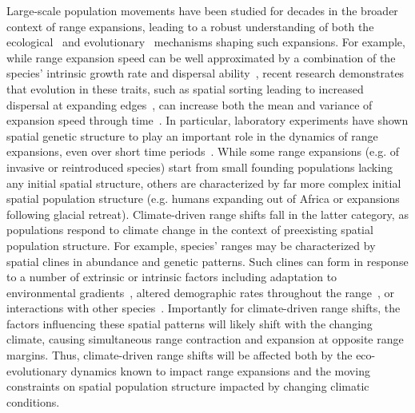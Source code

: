 \documentclass[11pt]{article}
\begin{document}
Large-scale population movements have been studied for decades in the broader context of range expansions, leading to a robust understanding of both the ecological~\citep{hastings2005spatial} and evolutionary~\citep{shine2011evolutionary, excoffier2009genetic} mechanisms shaping such expansions. For example, while range expansion speed can be well approximated by a combination of the species' intrinsic growth rate and dispersal ability~\citep{fisher1937wave, hastings2005spatial}, recent research demonstrates that evolution in these traits, such as spatial sorting leading to increased dispersal at expanding edges~\citep{shine2011evolutionary}, can increase both the mean and variance of expansion speed through time~\citep{szHucs2017rapid, shaw2015dispersal, phillips2015evolutionary}. In particular, laboratory experiments have shown spatial genetic structure to play an important role in the dynamics of range expansions, even over short time periods~\citep{weiss2017rapid, ochocki2017rapid}. While some range expansions (e.g. of invasive or reintroduced species) start from small founding populations lacking any initial spatial structure, others are characterized by far more complex initial spatial population structure (e.g. humans expanding out of Africa or expansions following glacial retreat). Climate-driven range shifts fall in the latter category, as populations respond to climate change in the context of preexisting spatial population structure. For example, species' ranges may be characterized by spatial clines in abundance and genetic patterns. Such clines can form in response to a number of extrinsic or intrinsic factors including adaptation to environmental gradients~\citep{kirkpatrick1997evolution}, altered demographic rates throughout the range~\citep{holt2005theoretical}, or interactions with other species~\citep{case2000interspecific}. Importantly for climate-driven range shifts, the factors influencing these spatial patterns will likely shift with the changing climate, causing simultaneous range contraction and expansion at opposite range margins. Thus, climate-driven range shifts will be affected both by the eco-evolutionary dynamics known to impact range expansions and the moving constraints on spatial population structure impacted by changing climatic conditions.
\end{document}
